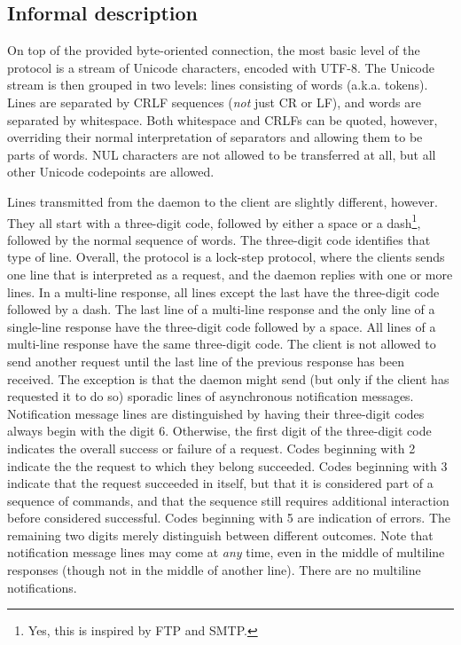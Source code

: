 \documentclass[twoside,a4paper,11pt]{article}
\begin{document}
\subsection{Informal description}

On top of the provided byte-oriented connection, the most basic level
of the protocol is a stream of Unicode characters, encoded with
UTF-8. The Unicode stream is then grouped in two levels: lines
consisting of words (a.k.a. tokens). Lines are separated by CRLF
sequences (\emph{not} just CR or LF), and words are separated by
whitespace. Both whitespace and CRLFs can be quoted, however,
overriding their normal interpretation of separators and allowing them
to be parts of words. NUL characters are not allowed to be transferred
at all, but all other Unicode codepoints are allowed.

Lines transmitted from the daemon to the client are slightly
different, however. They all start with a three-digit code, followed
by either a space or a dash\footnote{Yes, this is inspired by FTP and
  SMTP.}, followed by the normal sequence of words. The three-digit
code identifies that type of line. Overall, the protocol is a
lock-step protocol, where the clients sends one line that is
interpreted as a request, and the daemon replies with one or more
lines. In a multi-line response, all lines except the last have the
three-digit code followed by a dash. The last line of a multi-line
response and the only line of a single-line response have the
three-digit code followed by a space. All lines of a multi-line
response have the same three-digit code. The client is not allowed to
send another request until the last line of the previous response has
been received. The exception is that the daemon might send (but only
if the client has requested it to do so) sporadic lines of
asynchronous notification messages. Notification message lines are
distinguished by having their three-digit codes always begin with the
digit 6. Otherwise, the first digit of the three-digit code indicates
the overall success or failure of a request. Codes beginning with 2
indicate the the request to which they belong succeeded. Codes
beginning with 3 indicate that the request succeeded in itself, but
that it is considered part of a sequence of commands, and that the
sequence still requires additional interaction before considered
successful. Codes beginning with 5 are indication of errors. The
remaining two digits merely distinguish between different
outcomes. Note that notification message lines may come at \emph{any}
time, even in the middle of multiline responses (though not in the
middle of another line). There are no multiline notifications.
\end{document}
